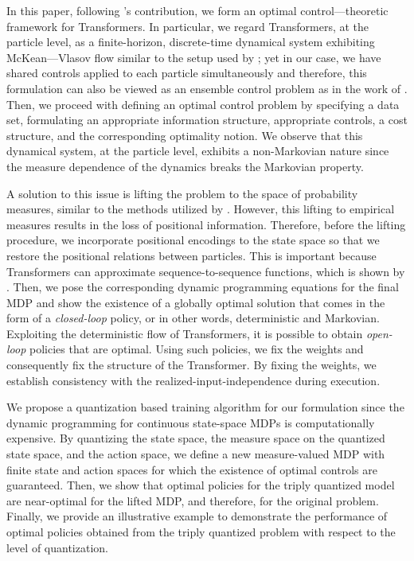 \documentclass[11pt]{article}
\begin{document}
In this paper, following \cite{geshkovski2025mathematical}'s contribution, we form an optimal control---theoretic framework for Transformers. In particular, we regard Transformers, at the particle level, as a finite-horizon, discrete-time dynamical system exhibiting McKean---Vlasov flow similar to the setup used by \cite{pham2016discrete}; yet in our case, we have shared controls applied to each particle simultaneously and therefore, this formulation can also be viewed as an ensemble control problem as in the work of \cite{li2009ensemble}. Then, we proceed with defining an optimal control problem by specifying a data set, formulating an appropriate information structure, appropriate controls, a cost structure, and the corresponding optimality notion. We observe that this dynamical system, at the particle level, exhibits a non-Markovian nature since the measure dependence of the dynamics breaks the Markovian property. 

A solution to this issue is lifting the problem to the space of probability measures, similar to the methods utilized by \cite{bauerle2023mean,carmona2023model,sanjari2025optimalitysymmetricindependentpolicies}. However, this lifting to empirical measures results in the loss of positional information. Therefore, before the lifting procedure, we incorporate positional encodings to the state space so that we restore the positional relations between particles. This is important because Transformers can approximate sequence-to-sequence functions, which is shown by \cite{yun2019transformers}. Then, we pose the corresponding dynamic programming equations for the final MDP and show the existence of a globally optimal solution that comes in the form of a \emph{closed-loop} policy, or in other words, deterministic and Markovian. Exploiting the deterministic flow of Transformers, it is possible to obtain \emph{open-loop} policies that are optimal. Using such policies, we fix the weights and consequently fix the structure of the Transformer. By fixing the weights, we establish consistency with the realized-input-independence during execution.

We propose a quantization based training algorithm for our formulation since the dynamic programming for continuous state-space MDPs is computationally expensive. By quantizing the state space, the measure space on the quantized state space, and the action space, we define a new measure-valued MDP with finite state and action spaces for which the existence of optimal controls are guaranteed. Then, we show that optimal policies for the triply quantized model are near-optimal for the lifted MDP, and therefore, for the original problem. Finally, we provide an illustrative example to demonstrate the performance of optimal policies obtained from the triply quantized problem with respect to the level of quantization.
\end{document}
